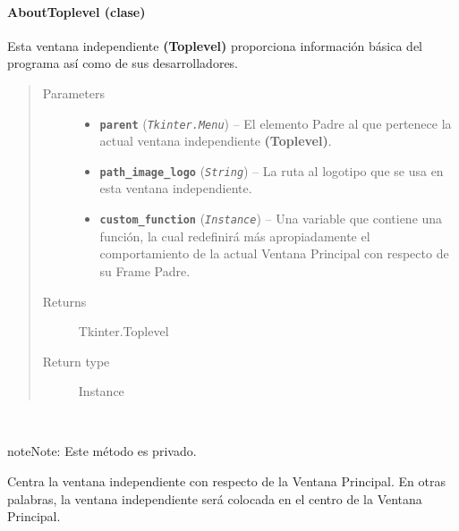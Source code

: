 \documentclass[class=report, crop=false]{standalone}
\begin{document}
\paragraph{AboutToplevel (clase)}
\label{sec:a_3_3_2_4}
\begin{fulllineitems}

\begin{DUlineblock}{0em}
\item[] Esta ventana independiente \textbf{(Toplevel)} 
proporciona información básica del programa así como 
de sus desarrolladores.
\end{DUlineblock}

\begin{quote}\begin{description}
\item[{Parameters}] \leavevmode\begin{itemize}
\item \textbf{\texttt{parent}} (\emph{\texttt{Tkinter.Menu}}) -- El elemento Padre al que pertenece la actual ventana independiente \textbf{(Toplevel)}.
\item \textbf{\texttt{path\_image\_logo}} (\emph{\texttt{String}}) -- La ruta al logotipo que se usa en esta ventana independiente.
\item \textbf{\texttt{custom\_function}} (\emph{\texttt{Instance}}) -- Una variable que contiene una función, la cual redefinirá más apropiadamente el comportamiento de la actual Ventana Principal con respecto de su Frame Padre.
\end{itemize}

\item[{Returns}] \leavevmode
Tkinter.Toplevel
\item[{Return type}] \leavevmode
Instance
\end{description}\end{quote}


\begin{fulllineitems}

~

\begin{notice}{note}{Note:}
Este método es privado.
\end{notice}

Centra la ventana independiente con respecto de 
la Ventana Principal.\break
En otras palabras, la ventana independiente será 
colocada en el centro de la Ventana Principal.
\end{fulllineitems}


\end{fulllineitems}
\end{document}
